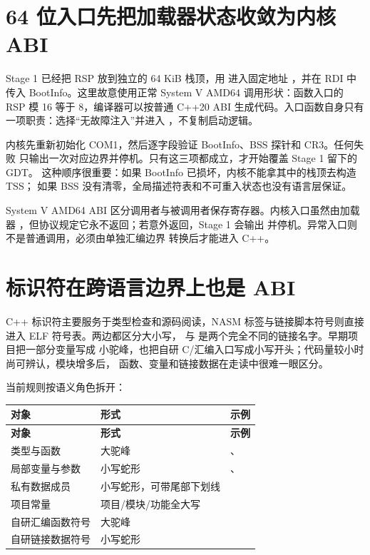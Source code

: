 \section{64 位入口先把加载器状态收敛为内核 ABI}

Stage 1 已经把 RSP 放到独立的 64 KiB 栈顶，用  进入固定地址
，并在 RDI 中传入 BootInfo。这里故意使用正常 System V
AMD64 调用形状：函数入口的 RSP 模 16 等于 8，编译器可以按普通 C++20 ABI
生成代码。入口函数自身只有一项职责：选择“无故障注入”并进入
，不复制启动逻辑。

内核先重新初始化 COM1，然后逐字段验证 BootInfo、BSS 探针和 CR3。任何失败
只输出一次对应边界并停机。只有这三项都成立，才开始覆盖 Stage 1 留下的 GDT。
这种顺序很重要：如果 BootInfo 已损坏，内核不能拿其中的栈顶去构造 TSS；
如果 BSS 没有清零，全局描述符表和不可重入状态也没有语言层保证。

System V AMD64 ABI 区分调用者与被调用者保存寄存器。内核入口虽然由加载器
，但协议规定它永不返回；若意外返回，Stage 1 会输出
 并停机。异常入口则不是普通调用，必须由单独汇编边界
转换后才能进入 C++。

\section{标识符在跨语言边界上也是 ABI}

C++ 标识符主要服务于类型检查和源码阅读，NASM 标签与链接脚本符号则直接进入
ELF 符号表。两边都区分大小写， 与
 是两个完全不同的链接名字。早期项目把一部分变量写成
小驼峰，也把自研 C/汇编入口写成小写开头；代码量较小时尚可辨认，模块增多后，
函数、变量和链接数据在走读中很难一眼区分。

当前规则按语义角色拆开：

\begin{longtable}{L{0.25\textwidth}L{0.27\textwidth}L{0.38\textwidth}}
\toprule
\textbf{对象} & \textbf{形式} & \textbf{示例}\\
\midrule
\endfirsthead
\toprule
\textbf{对象} & \textbf{形式} & \textbf{示例}\\
\midrule
\endhead
类型与函数 & 大驼峰 & 、\\
局部变量与参数 & 小写蛇形 & 、\\
私有数据成员 & 小写蛇形，可带尾部下划线 &
\\
项目常量 & 项目/模块/功能全大写 &
\\
自研汇编函数符号 & 大驼峰 & \\
自研链接数据符号 & 小写蛇形 & \\
\bottomrule
\end{longtable}

